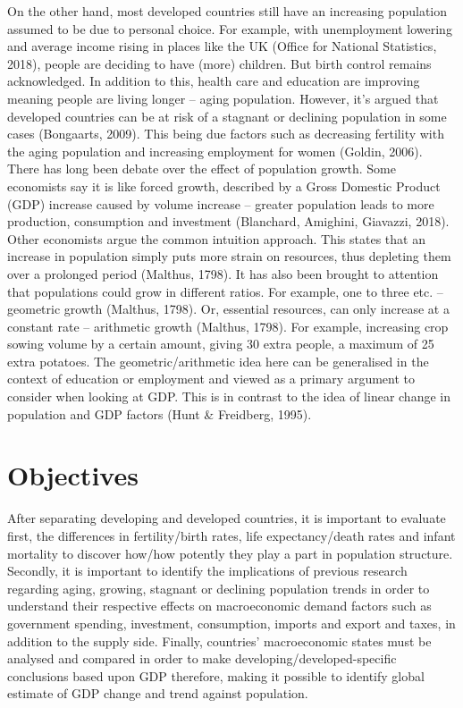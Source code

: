 \documentclass[11pt, english]{article}
\begin{document}
	On the other hand, most developed countries still have an increasing population assumed to be due to personal choice. For example, with unemployment lowering and average income rising in places like the UK (Office for National Statistics, 2018), people are deciding to have (more) children. But birth control remains acknowledged. In addition to this, health care and education are improving meaning people are living longer – aging population. However, it's argued that developed countries can be at risk of a stagnant or declining population in some cases (Bongaarts, 2009). This being due factors such as decreasing fertility with the aging population and increasing employment for women (Goldin, 2006).\\

	There has long been debate over the effect of population growth. Some economists say it is like forced growth, described by a Gross Domestic Product (GDP) increase caused by volume increase – greater population leads to more production, consumption and investment (Blanchard, Amighini, Giavazzi, 2018). Other economists argue the common intuition approach. This states that an increase in population simply puts more strain on resources, thus depleting them over a prolonged period (Malthus, 1798). It has also been brought to attention that populations could grow in different ratios. For example, one to three etc. – geometric growth (Malthus, 1798). Or, essential resources, can only increase at a constant rate – arithmetic growth (Malthus, 1798). For example, increasing crop sowing volume by a certain amount, giving 30 extra people, a maximum of 25 extra potatoes. The geometric/arithmetic idea here can be generalised in the context of education or employment and viewed as a primary argument to consider when looking at GDP. This is in contrast to the idea of linear change in population and GDP factors (Hunt \& Freidberg, 1995).

\newpage

\section{Objectives}

	After separating developing and developed countries, it is important to evaluate first, the differences in fertility/birth rates, life expectancy/death rates and infant mortality to discover how/how potently they play a part in population structure. Secondly, it is important to identify the implications of previous research regarding aging, growing, stagnant or declining population trends in order to understand their respective effects on macroeconomic demand factors such as government spending, investment, consumption, imports and export and taxes, in addition to the supply side. Finally, countries' macroeconomic states must be analysed and compared in order to make developing/developed-specific conclusions based upon GDP therefore, making it possible to identify global estimate of GDP change and trend against population.\\
\end{document}
